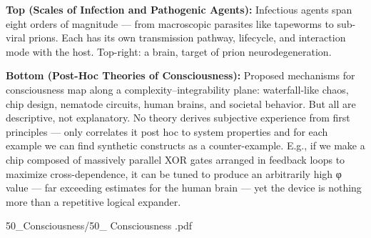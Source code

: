 \begin{SideNotePage}{
  \textbf{Top (Scales of Infection and Pathogenic Agents):}  
  Infectious agents span eight orders of magnitude — from macroscopic parasites like tapeworms to sub-viral prions. Each has its own transmission pathway, lifecycle, and interaction mode with the host. Top-right: a brain, target of prion neurodegeneration. \par

  \textbf{Bottom (Post-Hoc Theories of Consciousness):}  
  Proposed mechanisms for consciousness map along a complexity–integrability plane: waterfall-like chaos, chip design, nematode circuits, human brains, and societal behavior. But all are descriptive, not explanatory. No theory derives subjective experience from first principles — only correlates it post hoc to system properties and for each example we can find synthetic constructs as a counter-example. E.g., if we make a chip composed of massively parallel XOR gates arranged in feedback loops to maximize cross-dependence, it can be tuned to produce an arbitrarily high φ value — far exceeding estimates for the human brain — yet the device is nothing more than a repetitive logical expander. \par
}{50_Consciousness/50_ Consciousness .pdf}
\end{SideNotePage}

